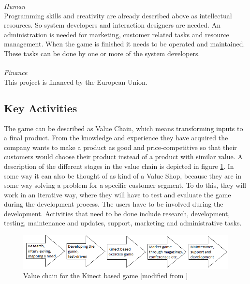 \emph{Human} \\ Programming skills and creativity are already described above as intellectual resources. So system developers and interaction designers are needed. An administration is needed for marketing, customer related tasks and resource management. When the game is finished it needs to be operated and maintained. These tasks can be done by one or more of the system developers. \\ \\
\emph{Finance} \\ This project is financed by the European Union. 
\subsection{Key Activities}
The game can be described as Value Chain, which means transforming inputs to a final product. From the knowledge and experience they have acquired the company wants to make a product as good and price-competitive so that their customers would choose their product instead of a product with similar value. A description of the different stages in the value chain is depicted in figure \ref{fig:ValueChainCase}. In some way it can also be thought of as kind of a Value Shop, because they are in some way solving a problem for a specific customer segment. To do this, they will work in an iterative way, where they will have to test and evaluate the game during the development process. The users have to be involved during the development. 
Activities that need to be done include research, development, testing, maintenance and updates, support, marketing and administrative tasks. 
\begin{figure}[h]
\caption[ValueChainCase]{Value chain for the Kinect based game [modified from \cite{osterwalderthesis}]}
\label{fig:ValueChainCase}
\begin{center}
\includegraphics[scale=0.7]{valuechaincase}
\end{center}
\end{figure}
